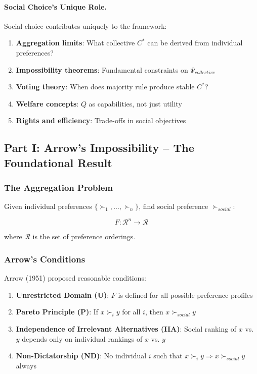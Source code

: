 \paragraph{Social Choice's Unique Role.}
Social choice contributes uniquely to the framework:
\begin{enumerate}
    \item \textbf{Aggregation limits}: What collective $C^*$ can be derived from individual preferences?
    \item \textbf{Impossibility theorems}: Fundamental constraints on $\Psi_{collective}$
    \item \textbf{Voting theory}: When does majority rule produce stable $C^*$?
    \item \textbf{Welfare concepts}: $Q$ as capabilities, not just utility
    \item \textbf{Rights and efficiency}: Trade-offs in social objectives
\end{enumerate}

\subsection{Part I: Arrow's Impossibility – The Foundational Result}

\subsubsection{The Aggregation Problem}

Given individual preferences $\{\succ_1, \ldots, \succ_n\}$, find social 
preference $\succ_{social}$:

\begin{equation}
F: \mathcal{R}^n \to \mathcal{R}
\end{equation}

where $\mathcal{R}$ is the set of preference orderings.

\subsubsection{Arrow's Conditions}

Arrow (1951) proposed reasonable conditions:

\begin{enumerate}
    \item \textbf{Unrestricted Domain (U)}: $F$ is defined for all possible preference profiles
    \item \textbf{Pareto Principle (P)}: If $x \succ_i y$ for all $i$, then $x \succ_{social} y$
    \item \textbf{Independence of Irrelevant Alternatives (IIA)}: Social ranking of $x$ vs. $y$ depends only on individual rankings of $x$ vs. $y$
    \item \textbf{Non-Dictatorship (ND)}: No individual $i$ such that $x \succ_i y \Rightarrow x \succ_{social} y$ always
\end{enumerate}

